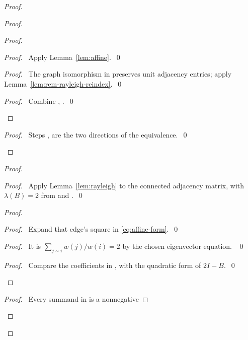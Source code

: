 \begin{proof}
\begin{proof}
\begin{proof}
\begin{proof}\pf\ Apply Lemma~\ref{lem:affine}.~\qed\end{proof}
\begin{proof}\raggedright\pf\ The graph isomorphism in 
preserves unit adjacency entries; apply Lemma~\ref{lem:rem-rayleigh-reindex}.~\qed\end{proof}
\qedstep
\begin{proof}\pf\ Combine , .~\qed\end{proof}
\end{proof}
\qedstep
\begin{proof}\pf\ Steps , 
are the two directions of the equivalence.~\qed\end{proof}
\end{proof}
\begin{proof}
\begin{proof}\pf\ Apply Lemma~\ref{lem:rayleigh} to the connected
adjacency matrix, with $\lambda(B)=2$ from 
and .~\qed\end{proof}
\begin{proof}
\begin{proof}\pf\ Expand that edge's square in \eqref{eq:affine-form}.~\qed\end{proof}
\begin{proof}\pf\ It is $\sum_{j\sim i}w(j)/w(i)=2$ by the chosen
eigenvector equation. ~\qed\end{proof}
\qedstep
\begin{proof}\pf\ Compare the coefficients in ,
 with the quadratic form of $2I-B$.~\qed\end{proof}
\end{proof}
\begin{proof}\pf\ Every summand in  is a nonnegative

\end{proof}
\end{proof}
\end{proof}
